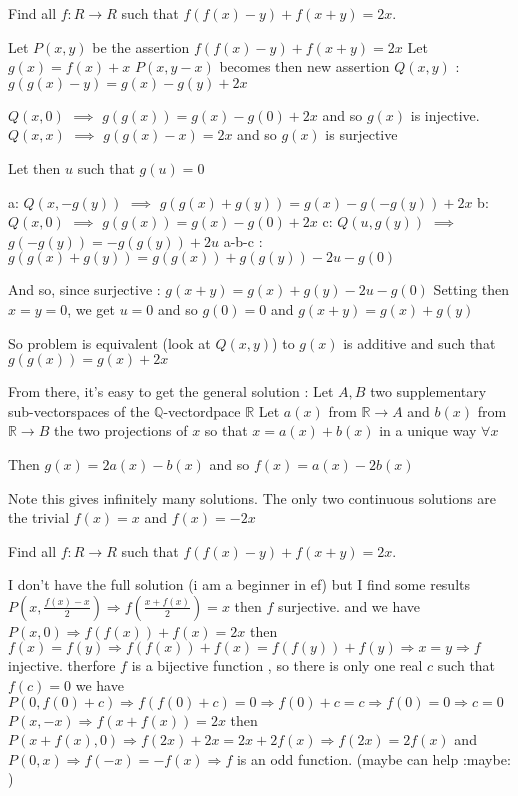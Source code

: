 \begin{solution}
	\begin{tcolorbox}Find all $f:R \rightarrow R $ such that
$f(f(x)-y)+f(x+y)=2x.$\end{tcolorbox}
Let $P(x,y)$ be the assertion $f(f(x)-y)+f(x+y)=2x$
Let $g(x)=f(x)+x$
$P(x,y-x)$ becomes then new assertion $Q(x,y)$ : $g(g(x)-y)=g(x)-g(y)+2x$

$Q(x,0)$ $\implies$ $g(g(x))=g(x)-g(0)+2x$ and so $g(x)$ is injective.
$Q(x,x)$ $\implies$ $g(g(x)-x)=2x$ and so $g(x)$ is surjective

Let then $u$ such that $g(u)=0$

a: $Q(x,-g(y))$ $\implies$ $g(g(x)+g(y))=g(x)-g(-g(y))+2x$
b: $Q(x,0)$ $\implies$ $g(g(x))=g(x)-g(0)+2x$
c: $Q(u,g(y))$ $\implies$ $g(-g(y))=-g(g(y))+2u$
a-b-c : $g(g(x)+g(y))=g(g(x))+g(g(y))-2u-g(0)$

And so, since surjective : $g(x+y)=g(x)+g(y)-2u-g(0)$
Setting then $x=y=0$, we get $u=0$ and so $g(0)=0$ and $g(x+y)=g(x)+g(y)$

So problem is equivalent (look at $Q(x,y)$) to 
$g(x)$ is additive and such that $g(g(x))=g(x)+2x$

From there, it's easy to get the general solution :
Let $A,B$ two supplementary sub-vectorspaces of the $\mathbb Q$-vectordpace $\mathbb R$
Let $a(x)$ from $\mathbb R\to A$ and $b(x)$ from $\mathbb R\to B$ the two projections of $x$ so that $x=a(x)+b(x)$ in a unique way $\forall x$

Then $g(x)=2a(x)-b(x)$ and so $f(x)=a(x)-2b(x)$

Note this gives infinitely many solutions.
The only two continuous solutions are the trivial $f(x)=x$ and $f(x)=-2x$
\end{solution}



\begin{solution}
	\begin{tcolorbox}Find all $f:R \rightarrow R $ such that
$f(f(x)-y)+f(x+y)=2x.$\end{tcolorbox}
I don't have the full solution (i am a beginner in ef) but I find some results 
$P\left ( x,\frac{f(x)-x}{2} \right )\Rightarrow f\left ( \frac{x+f(x)}{2} \right )=x$ then $f$ surjective.
and we have $P(x,0) \Rightarrow f(f(x))+f(x)=2x$ then $f(x)=f(y) \Rightarrow f(f(x))+f(x)=f(f(y))+f(y)  \Rightarrow x=y  \Rightarrow f$ injective.
therfore $f$ is a bijective function , so there is only one real $c$ such that $f(c)=0$ 
we have $P(0,f(0)+c)\Rightarrow f(f(0)+c)=0\Rightarrow f(0)+c=c\Rightarrow f(0)=0 \Rightarrow c=0$
$P(x,-x)\Rightarrow f(x+f(x))=2x$ then $P(x+f(x),0) \Rightarrow f(2x)+2x=2x+2f(x)\Rightarrow f(2x)=2f(x) $
and $P(0,x) \Rightarrow f(-x)=-f(x) \Rightarrow f$ is an odd function. (maybe can help  :maybe: )
\end{solution}



